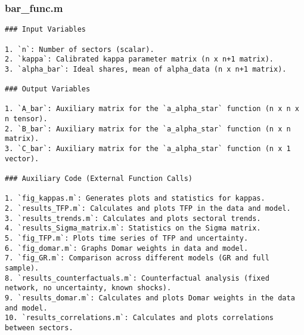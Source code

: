 \documentclass[11pt]{article}
\theoremstyle{definition}
\newcommand{\codepath}{F:/12004835/replication_package_final/replication_package_final}
\begin{document}
	\subsubsection{bar\_func.m}
	\begin{lstlisting}[style=Matlab]
### Input Variables

1. `n`: Number of sectors (scalar).
2. `kappa`: Calibrated kappa parameter matrix (n x n+1 matrix).
3. `alpha_bar`: Ideal shares, mean of alpha_data (n x n+1 matrix).

### Output Variables

1. `A_bar`: Auxiliary matrix for the `a_alpha_star` function (n x n x n tensor).
2. `B_bar`: Auxiliary matrix for the `a_alpha_star` function (n x n matrix).
3. `C_bar`: Auxiliary matrix for the `a_alpha_star` function (n x 1 vector).

### Auxiliary Code (External Function Calls)

1. `fig_kappas.m`: Generates plots and statistics for kappas.
2. `results_TFP.m`: Calculates and plots TFP in the data and model.
3. `results_trends.m`: Calculates and plots sectoral trends.
4. `results_Sigma_matrix.m`: Statistics on the Sigma matrix.
5. `fig_TFP.m`: Plots time series of TFP and uncertainty.
6. `fig_domar.m`: Graphs Domar weights in data and model.
7. `fig_GR.m`: Comparison across different models (GR and full sample).
8. `results_counterfactuals.m`: Counterfactual analysis (fixed network, no uncertainty, known shocks).
9. `results_domar.m`: Calculates and plots Domar weights in the data and model.
10. `results_correlations.m`: Calculates and plots correlations between sectors.
	\end{lstlisting}
	
	
	
\end{document}
